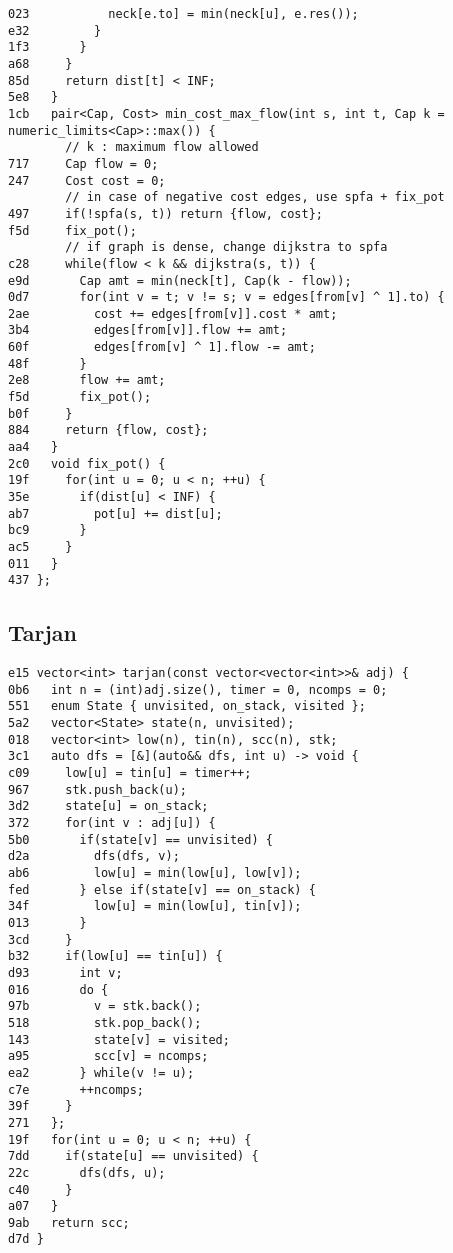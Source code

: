\documentclass[10pt, a4paper, twoside]{article}
\begin{document}
\begin{lstlisting}
023           neck[e.to] = min(neck[u], e.res());
e32         }
1f3       }
a68     }
85d     return dist[t] < INF;
5e8   }
1cb   pair<Cap, Cost> min_cost_max_flow(int s, int t, Cap k = numeric_limits<Cap>::max()) {
        // k : maximum flow allowed
717     Cap flow = 0;
247     Cost cost = 0;
        // in case of negative cost edges, use spfa + fix_pot
497     if(!spfa(s, t)) return {flow, cost};
f5d     fix_pot();
        // if graph is dense, change dijkstra to spfa
c28     while(flow < k && dijkstra(s, t)) {
e9d       Cap amt = min(neck[t], Cap(k - flow));
0d7       for(int v = t; v != s; v = edges[from[v] ^ 1].to) {
2ae         cost += edges[from[v]].cost * amt;
3b4         edges[from[v]].flow += amt;
60f         edges[from[v] ^ 1].flow -= amt;
48f       }
2e8       flow += amt;
f5d       fix_pot();
b0f     }
884     return {flow, cost};
aa4   }
2c0   void fix_pot() {
19f     for(int u = 0; u < n; ++u) {
35e       if(dist[u] < INF) {
ab7         pot[u] += dist[u];
bc9       }
ac5     }
011   }
437 };
\end{lstlisting}

\subsection{Tarjan}
\begin{lstlisting}
e15 vector<int> tarjan(const vector<vector<int>>& adj) {
0b6   int n = (int)adj.size(), timer = 0, ncomps = 0;
551   enum State { unvisited, on_stack, visited };
5a2   vector<State> state(n, unvisited);
018   vector<int> low(n), tin(n), scc(n), stk;
3c1   auto dfs = [&](auto&& dfs, int u) -> void {
c09     low[u] = tin[u] = timer++;
967     stk.push_back(u);
3d2     state[u] = on_stack;
372     for(int v : adj[u]) {
5b0       if(state[v] == unvisited) {
d2a         dfs(dfs, v);
ab6         low[u] = min(low[u], low[v]);
fed       } else if(state[v] == on_stack) {
34f         low[u] = min(low[u], tin[v]);
013       }
3cd     }
b32     if(low[u] == tin[u]) {
d93       int v;
016       do {
97b         v = stk.back();
518         stk.pop_back();
143         state[v] = visited;
a95         scc[v] = ncomps;
ea2       } while(v != u);
c7e       ++ncomps;
39f     }
271   };
19f   for(int u = 0; u < n; ++u) {
7dd     if(state[u] == unvisited) {
22c       dfs(dfs, u);
c40     }
a07   }
9ab   return scc;
d7d }
\end{lstlisting}
\end{document}
